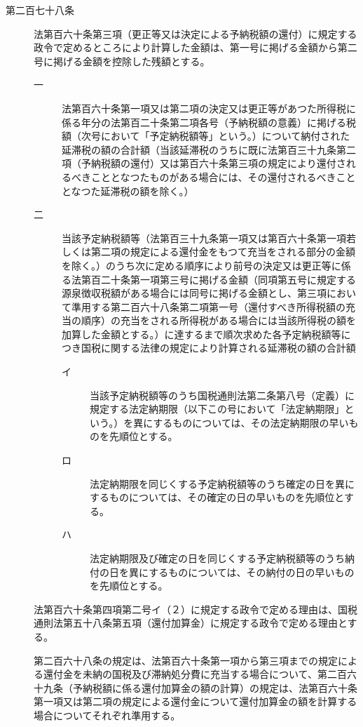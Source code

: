 \documentclass[twocolumn,a4j,10pt]{ltjtarticle}
\begin{document}
\begin{description}
\item[第二百七十八条]法第百六十条第三項（更正等又は決定による予納税額の還付）に規定する政令で定めるところにより計算した金額は、第一号に掲げる金額から第二号に掲げる金額を控除した残額とする。
\begin{description}
\item[一]法第百六十条第一項又は第二項の決定又は更正等があつた所得税に係る年分の法第百二十条第二項各号（予納税額の意義）に掲げる税額（次号において「予定納税額等」という。）について納付された延滞税の額の合計額（当該延滞税のうちに既に法第百三十九条第二項（予納税額の還付）又は第百六十条第三項の規定により還付されるべきこととなつたものがある場合には、その還付されるべきこととなつた延滞税の額を除く。）
\item[二]当該予定納税額等（法第百三十九条第一項又は第百六十条第一項若しくは第二項の規定による還付金をもつて充当をされる部分の金額を除く。）のうち次に定める順序により前号の決定又は更正等に係る法第百二十条第一項第三号に掲げる金額（同項第五号に規定する源泉徴収税額がある場合には同号に掲げる金額とし、第三項において準用する第二百六十八条第二項第一号（還付すべき所得税額の充当の順序）の充当をされる所得税がある場合には当該所得税の額を加算した金額とする。）に達するまで順次求めた各予定納税額等につき国税に関する法律の規定により計算される延滞税の額の合計額
\begin{description}
\item[イ]当該予定納税額等のうち国税通則法第二条第八号（定義）に規定する法定納期限（以下この号において「法定納期限」という。）を異にするものについては、その法定納期限の早いものを先順位とする。
\item[ロ]法定納期限を同じくする予定納税額等のうち確定の日を異にするものについては、その確定の日の早いものを先順位とする。
\item[ハ]法定納期限及び確定の日を同じくする予定納税額等のうち納付の日を異にするものについては、その納付の日の早いものを先順位とする。
\end{description}
\end{description}
\item[]法第百六十条第四項第二号イ（２）に規定する政令で定める理由は、国税通則法第五十八条第五項（還付加算金）に規定する政令で定める理由とする。
\item[]第二百六十八条の規定は、法第百六十条第一項から第三項までの規定による還付金を未納の国税及び滞納処分費に充当する場合について、第二百六十九条（予納税額に係る還付加算金の額の計算）の規定は、法第百六十条第一項又は第二項の規定による還付金について還付加算金の額を計算する場合についてそれぞれ準用する。
\end{description}
\end{document}
